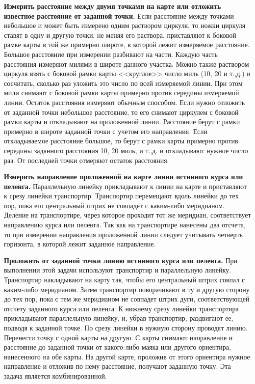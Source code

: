 \textbf{Измерить расстояние между двумя точками на карте или отложить известное расстояние от заданной точки.} Если расстояние между точками небольшое и может быть измерено одним раствором циркуля, то ножки циркуля ставят в одну и другую точки, не меняя его раствора, приставляют к боковой рамке карты в той же примерно широте, в которой лежит измеряемое расстояние. Большое расстояние при измерении разбивают на части. Каждую часть расстояния измеряют милями в широте данного участка. Можно также раствором циркуля взять с боковой рамки карты <<круглое>> число миль (10, 20 и т.\=,д.) и сосчитать, сколько раз уложить это число по всей измеряемой линии. При этом мили снимают с боковой рамки карты примерно против середины измеряемой линии. Остаток расстояния измеряют обычным способом. Если нужно отложить от заданной точки небольшое расстояние, то его снимают циркулем с боковой рамки карты и откладывают на проложенной линии. Расстояние берут с рамки примерно в широте заданной точки с учетом его направления. Если откладываемое расстояние большое, то берут с рамки карты примерно против середины заданного расстояния 10, 20 миль, и т.\=,д. и откладывают нужное число раз. От последней точки отмеряют остаток расстояния.
 
\textbf{Измерить направление проложенной на карте линии истинного курса или пеленга.} Параллельную линейку прикладывают к линии на карте и приставляют к срезу линейки транспортир. Транспортир перемещают вдоль линейки до тех пор, пока его центральный штрих не совпадет с каким-либо меридианом. Деление на транспортире, через которое проходит тот же меридиан, соответствует направлению курса или пеленга. Так как на транспортире нанесены два отсчета, то при измерении направления проложенной линии следует учитывать четверть горизонта, в которой лежит заданное направление. 

\textbf{Проложить от заданной точки линию истинного курса или пеленга.} При выполнении этой задачи используют транспортир и параллельную линейку. Транспортир накладывают на карту так, чтобы его центральный штрих совпал с каким-либо меридианом. Затем транспортир поворачивают в ту и другую сторону до тех пор, пока с тем же меридианом не совпадет штрих дуги, соответствующей отсчету заданного курса или пеленга. К нижнему срезу линейки транспортира прикладывают параллельную линейку, и, убрав транспортир, раздвигают ее, подводя к заданной точке. По срезу линейки в нужную сторону проводят линию. Перенести точку с одной карты на другую. С карты снимают направление и расстояние до заданной точки от какого-либо маяка или другого ориентира, нанесенного на обе карты. На другой карте, проложив от этого ориентира нужное направление и отложив по нему расстояние, получают заданную точку. Эта задача является комбинированной.

